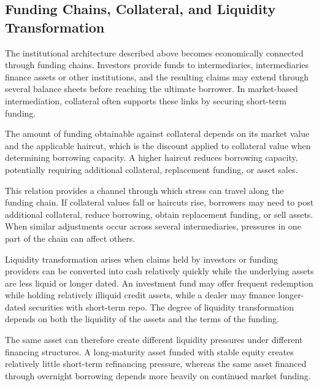 \subsection{Funding Chains, Collateral, and Liquidity Transformation}

The institutional architecture described above becomes economically connected through funding chains. Investors provide funds to intermediaries, intermediaries finance assets or other institutions, and the resulting claims may extend through several balance sheets before reaching the ultimate borrower. In market-based intermediation, collateral often supports these links by securing short-term funding.

The amount of funding obtainable against collateral depends
on its market value and the applicable haircut, which is
the discount applied to collateral value when determining
borrowing capacity. A higher haircut reduces borrowing
capacity, potentially requiring additional collateral,
replacement funding, or asset sales.

This relation provides a channel through which stress can travel along the funding chain. If collateral values fall or haircuts rise, borrowers may need to post additional collateral, reduce borrowing, obtain replacement funding, or sell assets. When similar adjustments occur across several intermediaries, pressures in one part of the chain can affect others.

Liquidity transformation arises when claims held by investors or funding providers can be converted into cash relatively quickly while the underlying assets are less liquid or longer dated. An investment fund may offer frequent redemption while holding relatively illiquid credit assets, while a dealer may finance longer-dated securities with short-term repo. The degree of liquidity transformation depends on both the liquidity of the assets and the terms of the funding.

The same asset can therefore create different liquidity
pressures under different financing structures. A
long-maturity asset funded with stable equity creates
relatively little short-term refinancing pressure,
whereas the same asset financed through overnight
borrowing depends more heavily on continued market funding.

